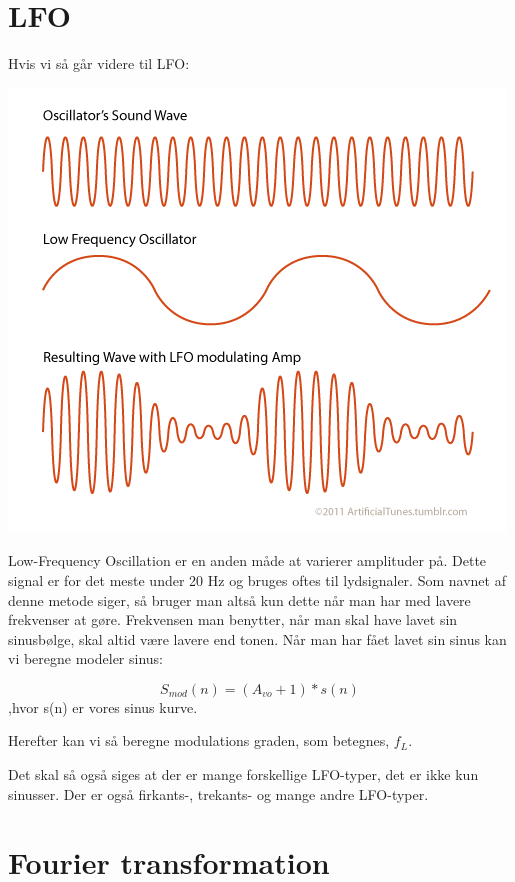 \documentclass[12pt, letterpaper]{article}
\begin{document}
\section{LFO}

Hvis vi så går videre til LFO: 

\begin{center}
\includegraphics[width=\textwidth]{billeder/LFO}
\end{center}

Low-Frequency Oscillation er en anden måde at varierer amplituder på. 
Dette signal er for det meste under 20 Hz og bruges oftes til lydsignaler. Som navnet af denne metode siger, så bruger man altså kun dette når man har med lavere frekvenser at gøre. Frekvensen man benytter, når man skal have lavet sin sinusbølge, skal altid være lavere end tonen. 
Når man har fået lavet sin sinus kan vi beregne modeler sinus: 

$$S_{mod} (n) = (A_{vo} + 1)*s(n)$$
,hvor s(n) er vores sinus kurve. 

Herefter kan vi så beregne modulations graden, som betegnes, $f_L$.

Det skal så også siges at der er mange forskellige LFO-typer, det er ikke kun sinusser. Der er også firkants-, trekants-  og mange andre LFO-typer. 


\section{Fourier transformation}
\end{document}
